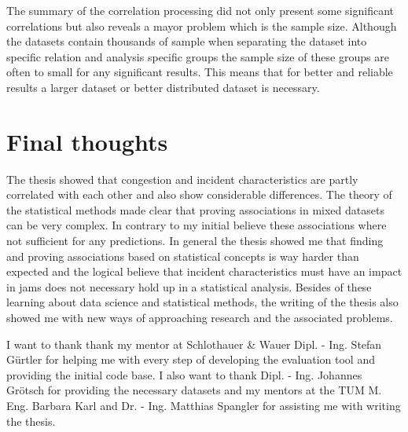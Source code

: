 \bigskip

The summary of the correlation processing did not only present some significant correlations but also reveals a mayor problem which is the sample size. Although the datasets contain thousands of sample when separating the dataset into specific relation and analysis specific groups the sample size of these groups are often to small for any significant results. This means that for better and reliable results a larger dataset or better distributed dataset is necessary.

\section{Final thoughts}
The thesis showed that congestion and incident characteristics are partly correlated with each other and also show considerable differences. The theory of the statistical methods made clear that proving associations in mixed datasets can be very complex. In contrary to my initial believe these associations where not sufficient for any predictions. In general the thesis showed me that finding and proving associations based on statistical concepts is way harder than expected and the logical believe that incident characteristics must have an impact in jams does not necessary hold up in a statistical analysis. Besides of these learning about data science and statistical methods, the writing of the thesis also showed me with new ways of approaching research and the associated problems. 

\bigskip

I want to thank thank my mentor at Schlothauer \& Wauer Dipl. - Ing. Stefan Gürtler for helping me with every step of developing the evaluation tool and providing the initial code base. I also want to thank Dipl. - Ing. Johannes Grötsch for providing the necessary datasets and my mentors at the TUM M. Eng. Barbara Karl and Dr. - Ing. Matthias Spangler for assisting me with writing the thesis.